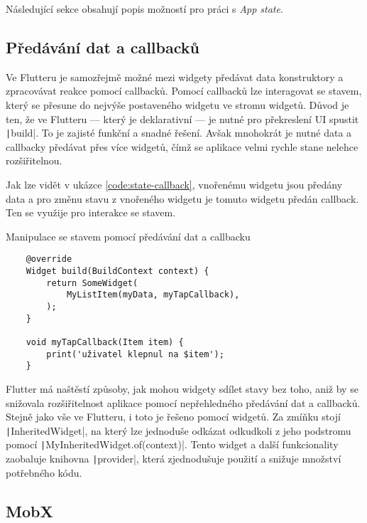 Následující sekce obsahují popis možností pro práci s \emph{App state}.

\subsection{Předávání dat a callbacků}

Ve Flutteru je samozřejmě možné mezi widgety předávat data konstruktory
a zpracovávat reakce pomocí callbacků.
Pomocí callbacků lze interagovat se stavem,
který se přesune do nejvýše postaveného widgetu ve stromu widgetů.
Důvod je ten,
že ve Flutteru
--- který je deklarativní ---
je nutné pro překreslení UI spustit \texttt|build|.
To je zajisté funkční a snadné řešení.
Avšak mnohokrát je nutné data a callbacky předávat přes více widgetů,
čímž se aplikace velmi rychle stane nelehce rozšiřitelnou.
\cite{flutter_state_mgmt_simple}

Jak lze vidět v ukázce \ref{code:state-callback},
vnořenému widgetu jsou předány data
a pro změnu stavu z vnořeného widgetu je tomuto widgetu předán callback.
Ten se využije pro interakce se stavem.

\begin{listing}
    \caption{Manipulace se stavem pomocí předávání dat a callbacku
\cite{flutter_state_mgmt_simple}}
    \label{code:state-callback}
    \begin{verbatim}
    @override
    Widget build(BuildContext context) {
        return SomeWidget(
            MyListItem(myData, myTapCallback),
        );
    }

    void myTapCallback(Item item) {
        print('uživatel klepnul na $item');
    }
    \end{verbatim}
\end{listing}

Flutter má naštěstí způsoby,
jak mohou widgety sdílet stavy bez toho,
aniž by se snižovala rozšiřitelnost aplikace pomocí nepřehledného předávání
dat a callbacků.
Stejně jako vše ve Flutteru,
i toto je řešeno pomocí widgetů.
Za zmíňku stojí \texttt|InheritedWidget|,
na který lze jednoduše odkázat odkudkoli z jeho podstromu pomocí
\texttt|MyInheritedWidget.of(context)|.
Tento widget a další funkcionality zaobaluje knihovna
\texttt|provider|,
která zjednodušuje použití a snižuje množství potřebného kódu.

\subsection{MobX}

